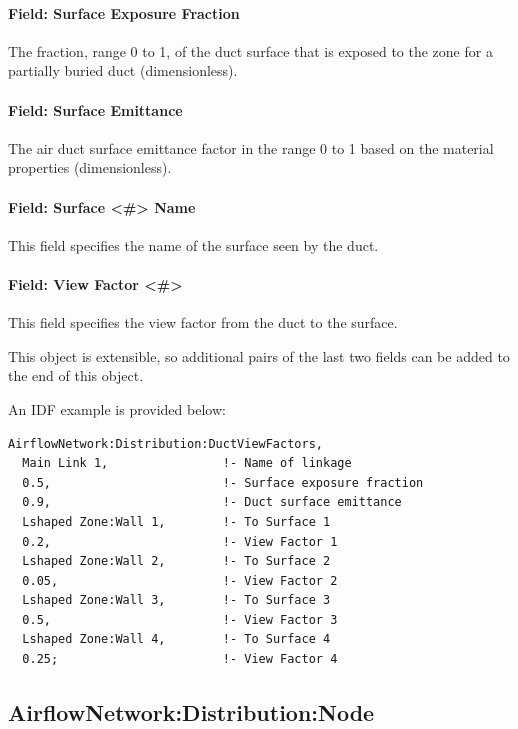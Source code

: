 \paragraph{Field: Surface Exposure Fraction}\label{field-surface-exposure-fraction}
The fraction, range 0 to 1, of the duct surface that is exposed to the zone for a partially buried duct (dimensionless).

\paragraph{Field: Surface Emittance}\label{field-surface-emittance}
The air duct surface emittance factor in the range 0 to 1 based on the material properties (dimensionless).

\paragraph{Field: Surface \textless{}\#\textgreater{} Name}\label{field-surface-1-name}
This field specifies the name of the surface seen by the duct.

\paragraph{Field: View Factor \textless{}\#\textgreater{}}\label{field-surface-1-view-factor}
This field specifies the view factor from the duct to the surface.

This object is extensible, so additional pairs of the last two fields can be added to the end of this object.

An IDF example is provided below:

\begin{lstlisting}
AirflowNetwork:Distribution:DuctViewFactors,
  Main Link 1,                !- Name of linkage
  0.5,                        !- Surface exposure fraction
  0.9,                        !- Duct surface emittance
  Lshaped Zone:Wall 1,        !- To Surface 1
  0.2,                        !- View Factor 1
  Lshaped Zone:Wall 2,        !- To Surface 2
  0.05,                       !- View Factor 2
  Lshaped Zone:Wall 3,        !- To Surface 3
  0.5,                        !- View Factor 3
  Lshaped Zone:Wall 4,        !- To Surface 4
  0.25;                       !- View Factor 4
\end{lstlisting}

\subsection{AirflowNetwork:Distribution:Node}\label{airflownetworkdistributionnode}

